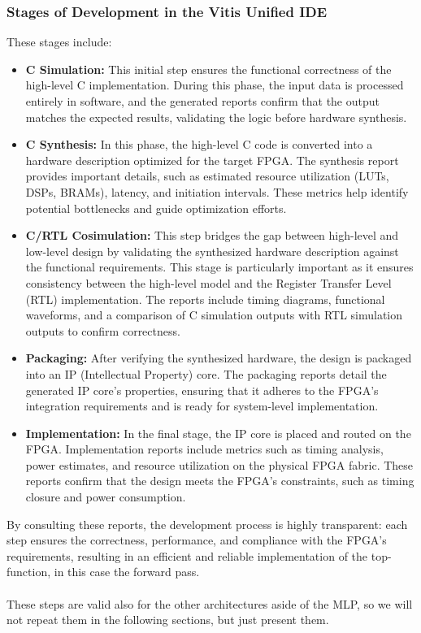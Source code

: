 \documentclass{article}
\begin{document}
\subsubsection{Stages of Development in the Vitis Unified IDE}
These stages include:

\begin{itemize}
    \item \textbf{C Simulation:} This initial step ensures the functional correctness of the high-level C implementation. During this phase, the input data is processed entirely in software, and the generated reports confirm that the output matches the expected results, validating the logic before hardware synthesis.

    \item \textbf{C Synthesis:} In this phase, the high-level C code is converted into a hardware description optimized for the target FPGA. The synthesis report provides important details, such as estimated resource utilization (LUTs, DSPs, BRAMs), latency, and initiation intervals. These metrics help identify potential bottlenecks and guide optimization efforts.

    \item \textbf{C/RTL Cosimulation:} This step bridges the gap between high-level and low-level design by validating the synthesized hardware description against the functional requirements. This stage is particularly important as it ensures consistency between the high-level model and the Register Transfer Level (RTL) implementation. The reports include timing diagrams, functional waveforms, and a comparison of C simulation outputs with RTL simulation outputs to confirm correctness.

    \item \textbf{Packaging:} After verifying the synthesized hardware, the design is packaged into an IP (Intellectual Property) core. The packaging reports detail the generated IP core's properties, ensuring that it adheres to the FPGA's integration requirements and is ready for system-level implementation.

    \item \textbf{Implementation:} In the final stage, the IP core is placed and routed on the FPGA. Implementation reports include metrics such as timing analysis, power estimates, and resource utilization on the physical FPGA fabric. These reports confirm that the design meets the FPGA's constraints, such as timing closure and power consumption.

\end{itemize}
By consulting these reports, the development process is highly transparent: each step ensures the correctness, performance, and compliance with the FPGA's requirements, resulting in an efficient and reliable implementation of the top-function, in this case the forward pass.
\\\\These steps are valid also for the other architectures aside of the MLP, so we will not repeat them in the following sections, but just present them.
\end{document}
